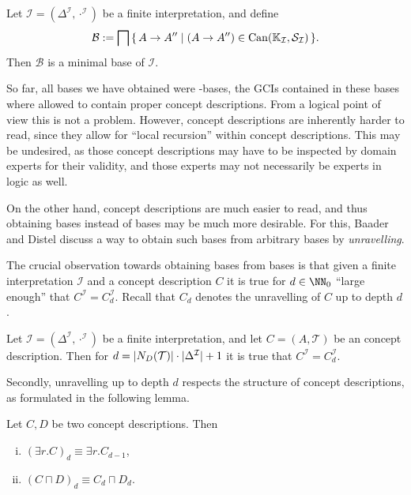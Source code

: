 \begin{Theorem}
  \label{thm:Felix-5.18}
  Let $\mathcal{I} = (\Delta^{\mathcal{I}}, \cdot^{\mathcal{I}})$ be a finite
  interpretation, and define
  \begin{equation*}
    \mathcal{B} := \bigsqcap {\ensuremath{\{\, A \to A'' \mid (A \to A'') \in \operatorname{Can}({\mathbb{K}}_{\mathcal{I}}, \mathcal{S}_{\mathcal{I}}) \,\}}}.
  \end{equation*}
  Then $\mathcal{B}$ is a minimal base of $\mathcal{I}$.
\end{Theorem}

So far, all bases we have obtained were \ELgfpbot-bases, \ie the GCIs contained in these
bases where allowed to contain proper \ELgfpbot concept descriptions.  From a logical
point of view this is not a problem.  However, \ELgfpbot concept descriptions are
inherently harder to read, since they allow for ``local recursion'' within concept
descriptions.  This may be undesired, as those concept descriptions may have to be
inspected by domain experts for their validity, and those experts may not necessarily be
experts in logic as well.

On the other hand, \ELbot concept descriptions are much easier to read, and thus obtaining
\ELbot bases instead of \ELgfpbot bases may be much more desirable.  For this, Baader and
Distel discuss a way to obtain such \ELbot bases from arbitrary \ELgfpbot bases by
\emph{unravelling}.

The crucial observation towards obtaining \ELbot bases from \ELgfpbot bases is that given
a finite interpretation $\mathcal{I}$ and a concept description $C$ it is true for $d \in
\NN_0$ ``large enough'' that $C^{\mathcal{I}} = C_d^{\mathcal{I}}$.  Recall that $C_d$
denotes the unravelling of $C$ up to depth $d$.

\begin{Lemma}
  \label{lem:Felix-lemma-5.5}
  Let $\mathcal{I} = (\Delta^{\mathcal{I}}, \cdot^{\mathcal{I}})$ be a finite
  interpretation, and let $C = (A, \mathcal{T})$ be an \ELgfp concept description.
  Then for $d = \lvert N_D(\mathcal{T}) \rvert \cdot \lvert \Delta^{\mathcal{I}} \rvert + 1$ it is
  true that $C^{\mathcal{I}} = C_d^{\mathcal{I}}$.
\end{Lemma}

Secondly, unravelling up to depth $d$ respects the structure of \ELbot concept
descriptions, as formulated in the following lemma.

\begin{Lemma}
  \label{lem:unravelling-is-homomorphism}
  Let $C, D$ be two \ELgfp concept descriptions.  Then
  \begin{enumerate}[i. ]
  \item $(\exists r. C)_d \equiv \exists r. C_{d-1}$,
  \item $(C \sqcap D)_d \equiv C_d \sqcap D_d$.
  \end{enumerate}
\end{Lemma}

